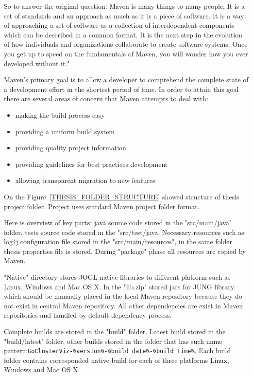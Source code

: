 \documentclass[a4paper,oneside]{article}
\begin{document}
So to answer the original question: Maven is many things to many people. It is a set of standards and an approach as much as it is a piece of software. It is a way of approaching a set of software as a collection of interdependent components which can be described in a common format. It is the next step in the evolution of how individuals and organizations collaborate to create software systems. Once you get up to speed on the fundamentals of Maven, you will wonder how you ever developed without it."~\cite{MAVEN_BOOK_2}


Maven's primary goal is to allow a developer to comprehend the complete state of a development effort in the shortest period of time. In order to attain this goal there are several areas of concern that Maven attempts to deal with:
\begin{itemize}
	\item making the build process easy
	\item providing a uniform build system
	\item providing quality project information
	\item providing guidelines for best practices development	
	\item allowing transparent migration to new features	
\end{itemize}


On the Figure~\ref{THESIS_FOLDER_STRUCTURE} showed structure of thesis project folder. Project uses stardard Maven project folder format. 


Here is overview of key parts: java source code stored in the "src/main/java" folder, tests source code stored in the "src/test/java. Necessary resources such as log4j configuration file stored in the "src/main/resources", in the same folder thesis properties file is stored. During "package" phase all resources are copied by Maven. 


"Native" directory stores JOGL native libraries to different platform such as Linux, Windows and Mac OS X. In the "lib.zip" stored jars for JUNG library which should be manually placed in the local Maven repository because they do not  exist in central Maven repository. All other dependencies are exist in Maven repositories and handled by default dependency process.


Complete builds are stored in the "build" folder. Latest build stored in the "build/latest" folder, other builds stored in the folder that has such name pattern:\texttt{GoClusterViz-\%version\%-\%build date\%-\%build time\%}. Each build folder contains corresponded native build for each of three platforms Linux, Windows and Mac OS X.
\end{document}
